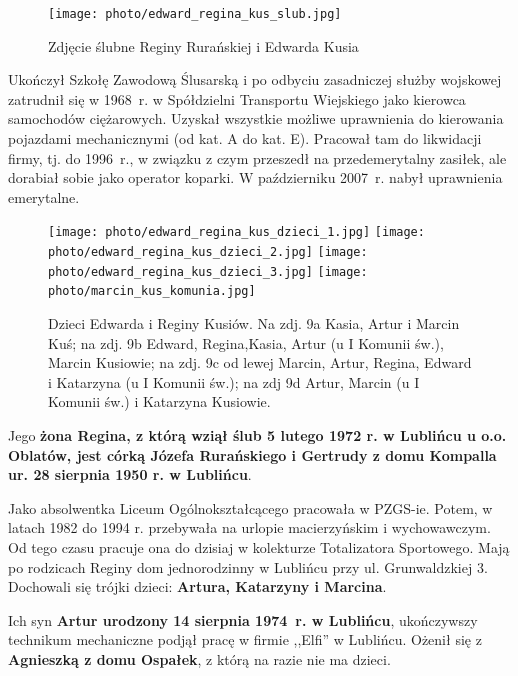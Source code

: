 \begin{figure}[!h]
\begin{center}
\texttt{[image: photo/edward\_regina\_kus\_slub.jpg]}
\caption{Zdjęcie ślubne Reginy Rurańskiej i Edwarda Kusia}
\label{rys:edward_regina_kus_slub}
\end{center}
\end{figure}

Ukończył Szkołę Zawodową Ślusarską i po odbyciu zasadniczej służby wojskowej zatrudnił się w 1968~r. w Spółdzielni Transportu Wiejskiego jako kierowca samochodów ciężarowych. Uzyskał wszystkie możliwe uprawnienia do kierowania pojazdami mechanicznymi (od kat. A do kat. E). Pracował tam do likwidacji firmy, tj. do 1996~r., w związku z czym przeszedł na przedemerytalny zasiłek, ale dorabiał sobie jako operator koparki. W październiku 2007~r. nabył uprawnienia emerytalne.

\begin{figure}[!h]
\begin{center}
\texttt{[image: photo/edward\_regina\_kus\_dzieci\_1.jpg]}
\texttt{[image: photo/edward\_regina\_kus\_dzieci\_2.jpg]}
\texttt{[image: photo/edward\_regina\_kus\_dzieci\_3.jpg]}
\texttt{[image: photo/marcin\_kus\_komunia.jpg]}
\caption[Dzieci Edwarda i Reginy Kusiów]{Dzieci Edwarda i Reginy Kusiów. Na zdj. 9a Kasia, Artur i Marcin Kuś; na zdj. 9b Edward, Regina,Kasia, Artur (u I Komunii św.), Marcin Kusiowie; na zdj. 9c od lewej Marcin, Artur, Regina, Edward i Katarzyna (u I Komunii św.); na zdj 9d Artur, Marcin (u I Komunii św.) i Katarzyna Kusiowie. }
\label{rys:edward_regina_kus_dzieci_1}
\end{center}
\end{figure}



Jego \textbf{żona Regina, z którą wziął ślub 5 lutego 1972 r. w Lublińcu u o.o. Oblatów, jest córką Józefa Rurańskiego i Gertrudy z domu Kompalla ur. 28 sierpnia 1950 r. w Lublińcu}.

Jako absolwentka Liceum Ogólnokształcącego pracowała w PZGS-ie. Potem, w latach 1982 do 1994 r. przebywała na urlopie macierzyńskim i wychowawczym. Od tego czasu pracuje ona do dzisiaj w kolekturze Totalizatora Sportowego. Mają po rodzicach Reginy dom jednorodzinny w Lublińcu przy ul. Grunwaldzkiej 3. Dochowali się trójki dzieci: \textbf{Artura, Katarzyny i Marcina}.


Ich syn \textbf{Artur urodzony 14 sierpnia 1974~r. w Lublińcu}, ukończywszy technikum mechaniczne podjął pracę w firmie ,,Elfi'' w Lublińcu. Ożenił się z \textbf{Agnieszką z domu Ospałek}, z którą na razie nie ma dzieci.

